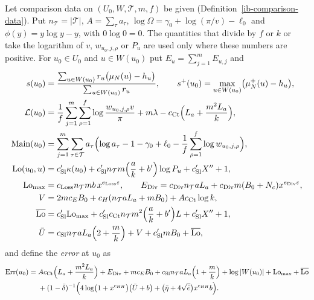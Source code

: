 \begin{definition}\label{ib-comparison-quantities}
Let comparison data on $(U_0,W,\mathcal T,m,f)$ be given
(Definition~\ref{ib-comparison-data}). Put
$n_{\mathcal T}=|\mathcal T|$, $A=\sum_{\tau}a_\tau$,
$\log\Omega=\gamma_0+\log(\pi/v)-\ell_0$ and $\phi(y)=y\log y-y$, with
$0\log0=0$. The quantities that divide by $f$ or $k$ or take the logarithm of
$v$, $w_{u_0,j,\rho}$ or $P_u$ are used only where these numbers are positive.
For $u_0\in U_0$ and $u\in W(u_0)$ put $E_u=\sum_{j=1}^mE_{u,j}$ and
\begin{align*}
 s(u_0)&=\frac{\sum_{u\in W(u_0)}r_u\bigl(\mu_N(u)-h_u\bigr)}{\sum_{u\in W(u_0)}r_u},
 \qquad s^+(u_0)=\max_{u\in W(u_0)}\bigl(\mu_N^+(u)-h_u\bigr),\\
 \mathcal L(u_0)&=\frac1f\sum_{j=1}^m\sum_{\rho=1}^f\log\frac{w_{u_0,j,\rho}v}{\pi}
 +m\lambda-c_{\mathrm{Ct}}\Bigl(L_a+\frac{m^2L_a}k\Bigr),\\
 \mathrm{Main}(u_0)&=\sum_{j=1}^m\sum_{\tau\in\mathcal T}a_\tau\Bigl(\log a_\tau-1-\gamma_0+\ell_0
 -\frac1f\sum_{\rho=1}^f\log w_{u_0,j,\rho}\Bigr),\\
 \mathrm{Lo}(u_0,u)&=c'_{\mathrm{Sl}}\kappa(u_0)
 +c'_{\mathrm{Sl}}n_{\mathcal T}m\Bigl(\frac ak+b'\Bigr)\log P_u+c'_{\mathrm{Sl}}X''+1,\\
 \mathrm{Lo}_{\max}&=c_{\mathrm{Loss}}n_{\mathcal T}mb\,x^{e_{\mathrm{Loss}}\varepsilon},\qquad
 E_{\mathrm{Div}}=c_{\mathrm{Div}}n_{\mathcal T}aL_a
 +c_{\mathrm{Div}}m(B_0+N_c)x^{e_{\mathrm{Div}}\varepsilon},\\
 V&=2mc_EB_0+c_H(n_{\mathcal T}aL_a+mB_0)+Ac_{\mathrm{Ct}}\log k,\\
 \overline{\mathrm{Lo}}&=c'_{\mathrm{Sl}}\mathrm{Lo}_{\max}
 +c'_{\mathrm{Sl}}c_{\mathrm{Ct}}n_{\mathcal T}m^2\Bigl(\frac ak+b'\Bigr)L
 +c'_{\mathrm{Sl}}X''+1,\\
 \bar U&=c_{\mathrm{Sl}}n_{\mathcal T}aL_a\Bigl(2+\frac mk\Bigr)+V
 +c'_{\mathrm{Sl}}mB_0+\overline{\mathrm{Lo}},
\end{align*}
and define the \emph{error} at $u_0$ as
\begin{align*}
 \mathrm{Err}(u_0)={}&Ac_{\mathrm{Ct}}\Bigl(L_a+\frac{m^2L_a}k\Bigr)+E_{\mathrm{Div}}
 +mc_EB_0+c_{\mathrm{Sl}}n_{\mathcal T}aL_a\Bigl(1+\frac mk\Bigr)
 +\log|W(u_0)|+\mathrm{Lo}_{\max}+\overline{\mathrm{Lo}}\\
 &+(1-\bar\delta)^{-1}\Bigl(4\log\bigl(1+x^{c_{HH}}\bigr)\bigl(\bar U+b\bigr)
 +\bigl(\bar\eta+4\sqrt{\bar e}\bigr)x^{c_{HH}}b\Bigr).
\end{align*}
\end{definition}
